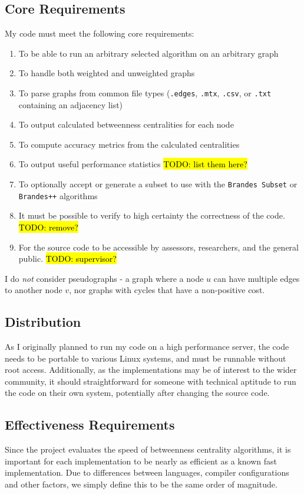 \documentclass[12pt,a4paper,twoside,openright]{report}
\newcommand{\todo}[1]{\hl{TODO: #1}}
\newcommand{\ttt}[1]{\texttt{#1}}
\begin{document}
	\subsection{Core Requirements}
	My code must meet the following core requirements:
	\begin{enumerate}
		\item To be able to run an arbitrary selected algorithm on an arbitrary graph
		\item To handle both weighted and unweighted graphs
		\item To parse graphs from common file types (\ttt{.edges}, \ttt{.mtx}, \ttt{.csv}, or \ttt{.txt} containing an adjacency list)
		\item To output calculated betweenness centralities for each node
		\item To compute accuracy metrics from the calculated centralities
		\item To output useful performance statistics \todo{list them here?}
		\item To optionally accept or generate a subset to use with the \ttt{Brandes Subset} or \ttt{Brandes++} algorithms
		\item It must be possible to verify to high certainty the correctness of the code. \todo{remove?}
		\item For the source code to be accessible by assessors, researchers, and the general public. \todo{supervisor?}
	\end{enumerate}
	I do \textit{not} consider pseudographs - a graph where a node $u$ can have multiple edges to another node $v$, nor graphs with cycles that have a non-positive cost.
	\subsection{Distribution}
	As I originally planned to run my code on a high performance server, the code needs to be portable to various Linux systems, and must be runnable without root access. Additionally, as the implementations may be of interest to the wider community, it should straightforward for someone with technical aptitude to run the code on their own system, potentially after changing the source code.
	\subsection{Effectiveness Requirements}
	Since the project evaluates the speed of betweenness centrality algorithms, it is important for each implementation to be nearly as efficient as a known fast implementation. Due to differences between languages, compiler configurations and other factors, we simply define this to be the same order of magnitude.
	
\end{document}
